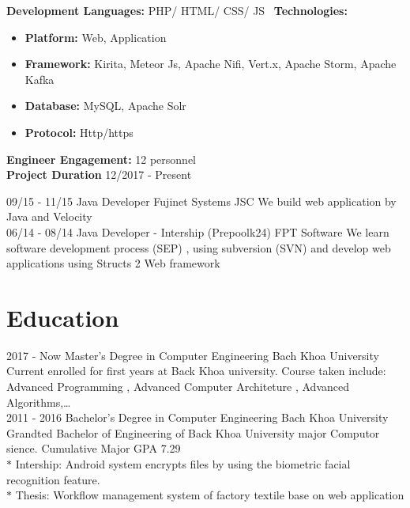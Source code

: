 \documentclass[]{friggeri-cv}
\begin{document}
\begin{entrylist}
{	 \textbf{Development Languages:} PHP/ HTML/ CSS/ JS~
	 \textbf{Technologies:}~
			\begin{itemize}
				\item \textbf{Platform:}  Web, Application
				\item \textbf{Framework:} Kirita, Meteor Js, Apache Nifi,  Vert.x, Apache Storm, Apache Kafka  
				\item \textbf{Database:} MySQL, Apache Solr
				\item \textbf{Protocol:} Http/https
			\end{itemize}
	 \textbf{Engineer Engagement:} 12 personnel\\
	 \textbf{Project Duration} 12/2017 - Present~
	}
  \entry
    {09/15 - 11/15}
    {Java Developer}
    {Fujinet Systems JSC}
    {We build web application by Java and Velocity\\}
    \entry
    {06/14 - 08/14}
    {Java Developer - Intership (Prepoolk24)}
    {FPT Software}
    {We learn software development process (SEP) , using subversion (SVN) and develop web applications using Structs 2 Web framework\\}
\end{entrylist}
\newpage
\section{Education}
\begin{entrylist}
  \entry
    {2017 - Now}
    {Master's Degree in Computer Engineering}
    {Bach Khoa University}
    {Current enrolled for first years at Back Khoa university. Course taken include: 
Advanced Programming , Advanced Computer Architeture , Advanced Algorithms,…\\}
  \entry
    {2011 - 2016}
    {Bachelor's Degree in Computer Engineering}
    {Bach Khoa University}
    {Grandted Bachelor of Engineering of Back Khoa University major Computor sience. Cumulative Major GPA 7.29\\
       $*$ Intership: Android system encrypts files by using the biometric facial recognition feature.\\
       $*$ Thesis: 	Workflow management system of factory textile base on web application\\}
\end{entrylist}

\end{document}
